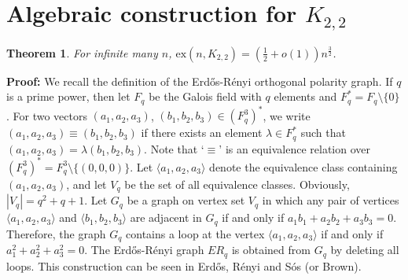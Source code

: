 \documentclass[12pt]{article}
\newtheorem{theorem}{Theorem}
\newcommand{\ex}{\mathrm{ex}}
\begin{document}
\section{Algebraic construction for $K_{2,2}$}
\begin{theorem}
	For infinite many $n$, $\ex(n,K_{2,2})=(\tfrac{1}{2}+o(1))n^{\frac{3}{2}}$.
\end{theorem}
{\bf Proof:}	We recall the definition of the Erd\H{o}s-R\'{e}nyi orthogonal polarity graph.  If $q$ is a prime power, then let $F_q$ be the Galois field with $q$ elements and $F_q^*=F_q\setminus\{0\}$.
	For two vectors $(a_1,a_2,a_3)$, $(b_1,b_2,b_3)\in (F_q^3)^*$, we write $(a_1,a_2,a_3)\equiv(b_1,b_2,b_3)$ if there exists an element $\lambda\in F_q^*$ such that $(a_1,a_2,a_3)=\lambda(b_1,b_2,b_3)$.  Note that `$\equiv$' is an equivalence relation over $(F_q^3)^*=F_q^3\setminus\{(0,0,0)\}$.
	Let $\langle a_1,a_2,a_3 \rangle$ denote the equivalence class containing $(a_1,a_2,a_3)$, and let $V_q$ be the set of all equivalence classes. Obviously, $|V_q|=q^2+q+1$.	
	Let $G_q$ be a graph on vertex set $V_q$ in which any pair of vertices $\langle a_1,a_2,a_3 \rangle$ and $\langle b_1,b_2,b_3 \rangle$ are adjacent in $G_q$ if and only if $a_1b_1+a_2b_2+a_3b_3=0.$
	Therefore, the graph $G_q$ contains a loop at the vertex $\langle a_1,a_2,a_3 \rangle$ if and only if $a_1^2+a_2^2+a_3^2=0.$
	The Erd\H{o}s-R\'{e}nyi graph $ER_q$ is obtained from $G_q$ by deleting all loops. This construction can be seen in Erd\H{o}s, R\'{e}nyi and S\'{o}s  (or Brown).
	
\end{document}

